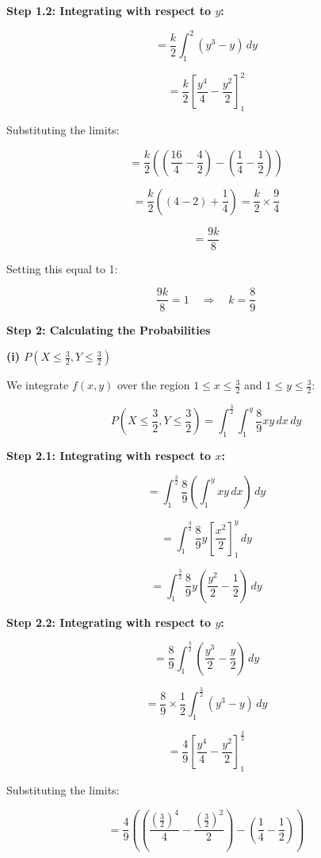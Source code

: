 \documentclass{article}
\begin{document}
\textbf{Step 1.2: Integrating with respect to \(y\):}

\[
= \frac{k}{2} \int_{1}^{2} (y^3 - y) \, dy
\]

\[
= \frac{k}{2} \left[ \frac{y^4}{4} - \frac{y^2}{2} \right]_{1}^{2}
\]

Substituting the limits:

\[
= \frac{k}{2} \left( \left( \frac{16}{4} - \frac{4}{2} \right) - \left( \frac{1}{4} - \frac{1}{2} \right) \right)
\]

\[
= \frac{k}{2} \left( (4 - 2) + \frac{1}{4} \right) = \frac{k}{2} \times \frac{9}{4}
\]

\[
= \frac{9k}{8}
\]

Setting this equal to 1:

\[
\frac{9k}{8} = 1 \quad \Rightarrow \quad k = \frac{8}{9}
\]

\textbf{Step 2: Calculating the Probabilities}

\textbf{(i) \(P\left( X \leq \frac{3}{2}, Y \leq \frac{3}{2} \right)\)}

We integrate \(f(x, y)\) over the region \(1 \leq x \leq \frac{3}{2}\) and \(1 \leq y \leq \frac{3}{2}\):

\[
P\left( X \leq \frac{3}{2}, Y \leq \frac{3}{2} \right) = \int_{1}^{\frac{3}{2}} \int_{1}^{y} \frac{8}{9}xy \, dx \, dy
\]

\textbf{Step 2.1: Integrating with respect to \(x\):}

\[
= \int_{1}^{\frac{3}{2}} \frac{8}{9} \left( \int_{1}^{y} xy \, dx \right) \, dy
\]

\[
= \int_{1}^{\frac{3}{2}} \frac{8}{9} y \left[ \frac{x^2}{2} \right]_{1}^{y} \, dy
\]

\[
= \int_{1}^{\frac{3}{2}} \frac{8}{9} y \left( \frac{y^2}{2} - \frac{1}{2} \right) \, dy
\]

\textbf{Step 2.2: Integrating with respect to \(y\):}

\[
= \frac{8}{9} \int_{1}^{\frac{3}{2}} \left( \frac{y^3}{2} - \frac{y}{2} \right) \, dy
\]

\[
= \frac{8}{9} \times \frac{1}{2} \int_{1}^{\frac{3}{2}} (y^3 - y) \, dy
\]

\[
= \frac{4}{9} \left[ \frac{y^4}{4} - \frac{y^2}{2} \right]_{1}^{\frac{3}{2}}
\]

Substituting the limits:

\[
= \frac{4}{9} \left( \left( \frac{\left(\frac{3}{2}\right)^4}{4} - \frac{\left(\frac{3}{2}\right)^2}{2} \right) - \left( \frac{1}{4} - \frac{1}{2} \right) \right)
\]
\end{document}
